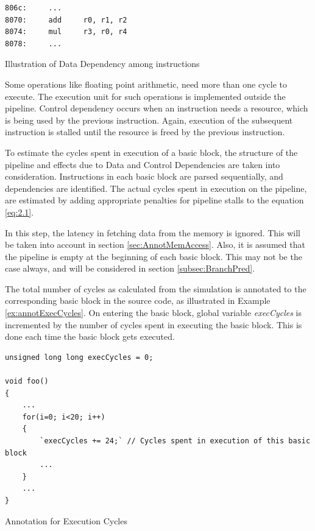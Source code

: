 \begin{Example}
\begin{lstlisting}
806c:     ...
8070:     add     r0, r1, r2
8074:     mul     r3, r0, r4
8078:     ...
\end{lstlisting}
\caption{Illustration of Data Dependency among instructions}
\label{ex:dataDep}
\end{Example}

Some operations like floating point arithmetic, need more than one cycle to execute. The execution unit for such operations is implemented outside the pipeline. Control dependency occurs when an instruction needs a resource, which is being used by the previous instruction. Again, execution of the subsequent instruction is stalled until the resource is freed by the previous instruction.

To estimate the cycles spent in execution of a basic block, the structure of the pipeline and effects due to Data and Control Dependencies are taken into consideration. Instructions in each basic block are parsed sequentially, and dependencies are identified. The actual cycles spent in execution on the pipeline, are estimated by adding appropriate penalties for pipeline stalls to the equation \ref{eq:2.1}.

In this step, the latency in fetching data from the memory is ignored. This will be taken into account in section \ref{sec:AnnotMemAccess}. Also, it is assumed that the pipeline is empty at the beginning of each basic block. This may not be the case always, and will be considered in section \ref{subsec:BranchPred}.

The total number of cycles as calculated from the simulation is annotated to the corresponding basic block in the source code, as illustrated in Example \ref{ex:annotExecCycles}. On entering the basic block, global variable \emph{execCycles} is incremented by the number of cycles spent in executing the basic block. This is done each time the basic block gets executed.

\begin{Example}[h]
\begin{lstlisting}
unsigned long long execCycles = 0;

void foo()
{
    ...
    for(i=0; i<20; i++)
    {
        `execCycles += 24;` // Cycles spent in execution of this basic block
        ...
    }
    ...
}
\end{lstlisting}
\caption{Annotation for Execution Cycles}
\label{ex:annotExecCycles}
\end{Example}

